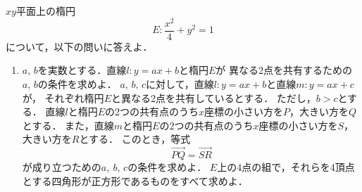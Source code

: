 \documentclass[../../main.tex]{subfiles}
\begin{document}
$xy$平面上の楕円
\[ E:\frac{x^2}{4}+y^2=1 \]
について，以下の問いに答えよ．
\begin{enumerate}
  \item$a, \, b$を実数とする．直線$l:y=ax+b$と楕円$E$が
    異なる2点を共有するための$a, \, b$の条件を求めよ．
  $a, \, b, \, c$に対して，直線$l:y=ax+b$と直線$m:y=ax+c$が，
    それぞれ楕円$E$と異なる2点を共有しているとする．
    ただし，$b>c$とする．
    直線$l$と楕円$E$の2つの共有点のうち$x$座標の小さい方を$P$，大きい方を$Q$とする．
    また，直線$m$と楕円$E$の2つの共有点のうち$x$座標の小さい方を$S$，大きい方を$R$とする．
    このとき，等式
    \[ \overrightarrow{PQ}=\overrightarrow{SR} \]
    が成り立つための$a, \ b, \, c$の条件を求めよ．
  $E$上の4点の組で，それらを4頂点とする四角形が正方形であるものをすべて求めよ．
\end{enumerate}
\end{document}
